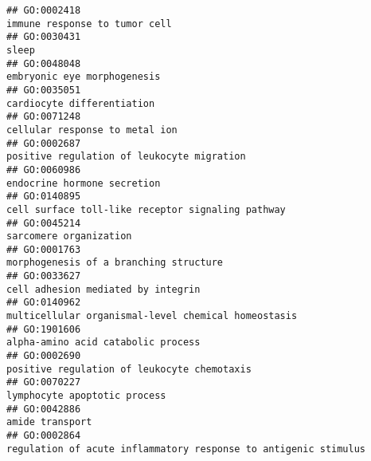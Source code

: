 \documentclass[
]{article}
\begin{document}
\begin{verbatim}
## GO:0002418                                                                                                                    immune response to tumor cell
## GO:0030431                                                                                                                                            sleep
## GO:0048048                                                                                                                      embryonic eye morphogenesis
## GO:0035051                                                                                                                       cardiocyte differentiation
## GO:0071248                                                                                                                   cellular response to metal ion
## GO:0002687                                                                                                       positive regulation of leukocyte migration
## GO:0060986                                                                                                                      endocrine hormone secretion
## GO:0140895                                                                                                cell surface toll-like receptor signaling pathway
## GO:0045214                                                                                                                           sarcomere organization
## GO:0001763                                                                                                           morphogenesis of a branching structure
## GO:0033627                                                                                                               cell adhesion mediated by integrin
## GO:0140962                                                                                              multicellular organismal-level chemical homeostasis
## GO:1901606                                                                                                               alpha-amino acid catabolic process
## GO:0002690                                                                                                      positive regulation of leukocyte chemotaxis
## GO:0070227                                                                                                                     lymphocyte apoptotic process
## GO:0042886                                                                                                                                  amide transport
## GO:0002864                                                                                  regulation of acute inflammatory response to antigenic stimulus

\end{verbatim}
\end{document}
